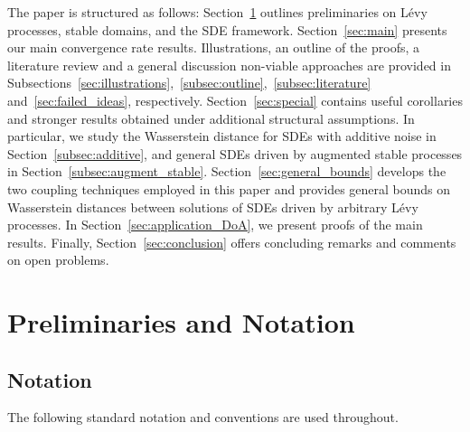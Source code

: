 \documentclass[en,oneside,bbfont,article]{amsart}
\theoremstyle{remark}
\theoremstyle{definition}
\theoremstyle{definition}
\newcommand\1{\mathds{1}}
\begin{document}
The paper is structured as follows: Section~\ref{sec:framework} outlines preliminaries on L\'evy processes, stable domains, and the SDE framework. Section~\ref{sec:main} presents our main convergence rate results. Illustrations, an outline of the proofs, a literature review and a general discussion non-viable approaches are provided in Subsections~\ref{sec:illustrations},~\ref{subsec:outline},~\ref{subsec:literature} and~\ref{sec:failed_ideas}, respectively. Section~\ref{sec:special} contains useful corollaries and stronger results obtained under additional structural assumptions. In particular, we study the Wasserstein distance for SDEs with additive noise in Section~\ref{subsec:additive}, and general SDEs driven by augmented stable processes in Section~\ref{subsec:augment_stable}. Section~\ref{sec:general_bounds} develops the two coupling techniques employed in this paper and provides general bounds on Wasserstein distances between solutions of SDEs driven by arbitrary L\'evy processes. In Section~\ref{sec:application_DoA}, we present proofs of the main results. Finally, Section~\ref{sec:conclusion} offers concluding remarks and comments on open problems.


\section{Preliminaries and Notation}
\label{sec:framework}

\subsection{Notation} 
\label{subsec:notation}

The following standard notation and conventions are used throughout.
\end{document}
